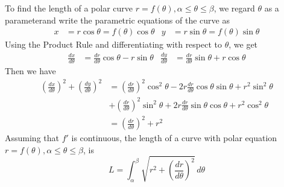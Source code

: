 To find the length of a polar curve \(r=f(\theta),\alpha\leq\theta\leq\beta\),
we regard \(\theta\) as a parameterand write the parametric equations of the
curve as
\begin{align*}
    x &= r\cos\theta=f(\theta)\cos\theta
    & y &= r\sin\theta=f(\theta)\sin\theta
\end{align*}
Using the Product Rule and differentiating with respect to \(\theta\), we get
\begin{align*}
    \frac{dx}{d\theta} &= \frac{dr}{d\theta}\cos\theta-r\sin\theta
    & \frac{dy}{d\theta} &= \frac{dr}{d\theta}\sin\theta+r\cos\theta
\end{align*}
Then we have
\begin{align*}
    \left(\frac{dx}{d\theta}\right)^2+\left(\frac{dy}{d\theta}\right)^2
    &= \left(\frac{dr}{d\theta}\right)^2\cos^2\theta
    -2r\frac{dr}{d\theta}\cos\theta\sin\theta+r^2\sin^2\theta \\
    &+ \left(\frac{dr}{d\theta}\right)^2\sin^2\theta
    +2r\frac{dr}{d\theta}\sin\theta\cos\theta+r^2\cos^2\theta \\
    &= \left(\frac{dr}{d\theta}\right)^2+r^2
\end{align*}
Assuming that \(f'\) is continuous, the length of a curve with polar equation
\(r=f(\theta),\alpha\leq\theta\leq\beta\), is
\[L
=\int_{\alpha}^{\beta}\sqrt{r^2+\left(\frac{dr}{d\theta}\right)^2}\,d\theta\]